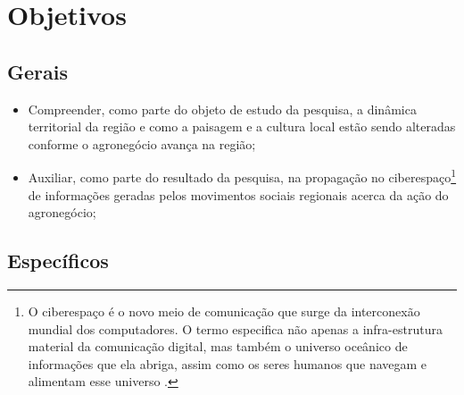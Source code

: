 \section{Objetivos}

\subsection{Gerais}

\begin{itemize}
 \item Compreender, como parte do objeto de estudo da pesquisa, a dinâmica territorial da região e como a paisagem e a cultura local estão sendo alteradas conforme o agronegócio avança na região;
 \item Auxiliar, como parte do resultado da pesquisa, na propagação no ciberespaço\footnote{O ciberespaço é o novo meio de comunicação que surge da interconexão mundial dos computadores. O termo especifica não apenas a infra-estrutura material da comunicação digital, mas também o universo oceânico de informações que ela abriga, assim como os seres humanos que navegam e alimentam esse universo \cite[p. 17]{levy}.} de informações geradas pelos movimentos sociais regionais acerca da ação do agronegócio;
\end{itemize}

\subsection{Específicos}

